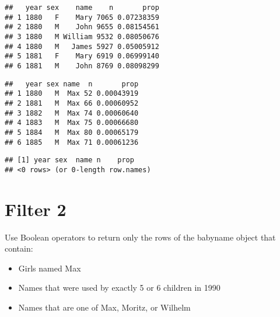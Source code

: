 \documentclass[
]{article}
\newenvironment{Shaded}{\begin{snugshade}}{\end{snugshade}}
\newcommand{\KeywordTok}[1]{\textcolor[rgb]{0.13,0.29,0.53}{\textbf{#1}}}
\newcommand{\NormalTok}[1]{#1}
\newcommand{\OperatorTok}[1]{\textcolor[rgb]{0.81,0.36,0.00}{\textbf{#1}}}
\newcommand{\StringTok}[1]{\textcolor[rgb]{0.31,0.60,0.02}{#1}}
\providecommand{\tightlist}{%
  \setlength{\itemsep}{0pt}\setlength{\parskip}{0pt}}
\begin{document}
\begin{verbatim}
##   year sex    name    n       prop
## 1 1880   F    Mary 7065 0.07238359
## 2 1880   M    John 9655 0.08154561
## 3 1880   M William 9532 0.08050676
## 4 1880   M   James 5927 0.05005912
## 5 1881   F    Mary 6919 0.06999140
## 6 1881   M    John 8769 0.08098299
\end{verbatim}

\begin{Shaded}
\end{Shaded}

\begin{verbatim}
##   year sex name  n       prop
## 1 1880   M  Max 52 0.00043919
## 2 1881   M  Max 66 0.00060952
## 3 1882   M  Max 74 0.00060640
## 4 1883   M  Max 75 0.00066680
## 5 1884   M  Max 80 0.00065179
## 6 1885   M  Max 71 0.00061236
\end{verbatim}

\begin{Shaded}
\end{Shaded}

\begin{verbatim}
## [1] year sex  name n    prop
## <0 rows> (or 0-length row.names)
\end{verbatim}

\hypertarget{filter-2}{%
\section{Filter 2}\label{filter-2}}

Use Boolean operators to return only the rows of the babyname object
that contain:

\begin{itemize}
\tightlist
\item
  Girls named Max
\item
  Names that were used by exactly 5 or 6 children in 1990
\item
  Names that are one of Max, Moritz, or Wilhelm
\end{itemize}
\end{document}
